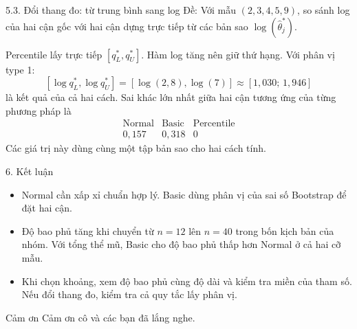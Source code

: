 \documentclass[aspectratio=43,10pt]{beamer}
\newcommand{\slidesource}{}
\begin{document}
\renewcommand{\slidesource}{Nguồn: Báo cáo nhóm D, tr. 18, 20--21, Bảng 8.2}
\begin{frame}{5.3. Đổi thang đo: từ trung bình sang log}
    \small
    Đề: Với mẫu $(2,3,4,5,9)$, so sánh log của hai cận gốc với hai cận dựng trực tiếp từ các bản sao $\log(\hat\theta_j^*)$.
    \medskip

    Percentile lấy trực tiếp $[q_L^*,q_U^*]$. Hàm log tăng nên giữ thứ hạng. Với phân vị type 1:
    \[
    [\log q_L^*,\log q_U^*]=[\log(2{,}8),\log(7)]
    \approx[1{,}030;\,1{,}946]
    \]
    là kết quả của cả hai cách. Sai khác lớn nhất giữa hai cận tương ứng của từng phương pháp là
    \[
    \begin{array}{ccc}
    \text{Normal} & \text{Basic} & \text{Percentile}\\
    0{,}157 & 0{,}318 & 0
    \end{array}
    \]
    Các giá trị này dùng cùng một tập bản sao cho hai cách tính.
\end{frame}

\renewcommand{\slidesource}{Nguồn: Báo cáo nhóm D, tr. 21--24}
\begin{frame}{6. Kết luận}
    \begin{itemize}
        \item Normal cần xấp xỉ chuẩn hợp lý. Basic dùng phân vị của sai số Bootstrap để đặt hai cận.
        \item Độ bao phủ tăng khi chuyển từ $n=12$ lên $n=40$ trong bốn kịch bản của nhóm. Với tổng thể mũ, Basic cho độ bao phủ thấp hơn Normal ở cả hai cỡ mẫu.
        \item Khi chọn khoảng, xem độ bao phủ cùng độ dài và kiểm tra miền của tham số. Nếu đổi thang đo, kiểm tra cả quy tắc lấy phân vị.
    \end{itemize}
\end{frame}

\renewcommand{\slidesource}{}
\begin{frame}{Cảm ơn}
    \centering\Large Cảm ơn cô và các bạn đã lắng nghe.
\end{frame}
\end{document}
